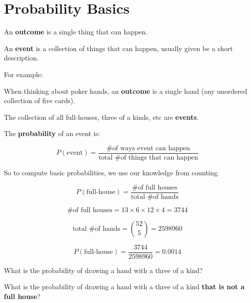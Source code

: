 \section{Probability Basics}

%
\begin{frame}

An \textbf{outcome} is a single thing that can happen.

\hfill

An \textbf{event} is a collection of things that can happen, usually given be a
short description.

\end{frame}
%

%
\begin{frame}

For example:

\hfill

When thinking about poker hands, an \textbf{outcome} is a single hand (any
unordered collection of five cards).

\hfill

The collection of all full-houses, three of a kinds, etc are \textbf{events}.

\end{frame}


%
\begin{frame}

The \textbf{probability} of an event is:

$$ P(\text{event}) = \frac{\text{\# of ways event can happen}}{\text{total \# of
things that can happen}} $$

So to compute basic probabilities, we use our knowledge from counting.

\end{frame}
%

%
\begin{frame}

$$ P(\text{full-house}) = \frac{\text{\# of full houses}}{\text{total \# of
hands}} $$

\end{frame}
%

%
\begin{frame}

$$ \text{\# of full houses} = 13 \times 6 \times 12 \times 4 = 3744 $$

$$ \text{total \# of hands} = {{52}\choose{5}} = 2598960 $$

\end{frame}
%

%
\begin{frame}

$$ P(\text{full-house}) = \frac{3744}{2598960} = 0.0014 $$

\end{frame}
%

%
\begin{frame}

What is the probability of drawing a hand with a three of a kind?

\hfill

What is the probability of drawing a hand with a three of a kind \textbf{that is
not a full house}?

\end{frame}

